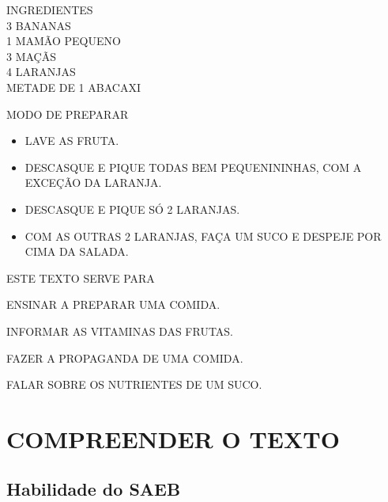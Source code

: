 INGREDIENTES\\
3 BANANAS\\
1 MAMÃO PEQUENO\\
3 MAÇÃS\\
4 LARANJAS\\
METADE DE 1 ABACAXI\medskip

MODO DE PREPARAR

\begin{itemize}
\item
  LAVE AS FRUTA.
\item
  DESCASQUE E PIQUE TODAS BEM PEQUENININHAS, COM A EXCEÇÃO DA LARANJA.
\item
  DESCASQUE E PIQUE SÓ 2 LARANJAS.
\item
  COM AS OUTRAS 2 LARANJAS, FAÇA UM SUCO E DESPEJE POR CIMA DA SALADA.
\end{itemize}



ESTE TEXTO SERVE PARA

\begin{escolha}
\item ENSINAR A PREPARAR UMA COMIDA.

\item INFORMAR AS VITAMINAS DAS FRUTAS.

\item FAZER A PROPAGANDA DE UMA COMIDA.

\item FALAR SOBRE OS NUTRIENTES DE UM SUCO.
\end{escolha}

\chapter{COMPREENDER O TEXTO}

\enlargethispage{2\baselineskip}

\section*{Habilidade do SAEB}

